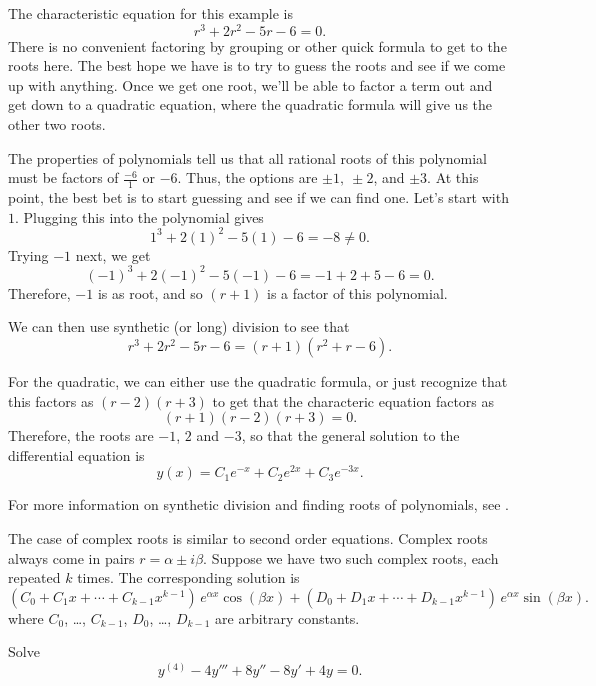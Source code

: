 \documentclass{ximera}
\begin{document}
\begin{exampleSol}
    The characteristic equation for this example is
    \[ 
        r^3 + 2r^2 - 5r - 6 = 0.
    \]
    There is no convenient factoring by grouping or other quick formula to get to the roots here. The best hope we have is to try to guess the roots and see if we come up with anything. Once we get one root, we'll be able to factor a term out and get down to a quadratic equation, where the quadratic formula will give us the other two roots. 
    
    The properties of polynomials tell us that all rational roots of this polynomial must be factors of $\frac{-6}{1}$ or $-6$. Thus, the options are $\pm 1,\ \pm 2$, and $\pm 3$. At this point, the best bet is to start guessing and see if we can find one. Let's start with $1$. Plugging this into the polynomial gives
    \[ 
        1^3 + 2(1)^2 - 5(1) - 6 = -8 \neq 0. 
    \] 
    Trying $-1$ next, we get
    \[ 
        (-1)^3 + 2(-1)^2 - 5(-1) - 6 = -1+2+5-6 = 0. 
    \] 
    Therefore, $-1$ is as root, and so $(r+1)$ is a factor of this polynomial. 
    
    We can then use synthetic (or long) division to see that
    \[ 
        r^3 + 2r^2 - 5r - 6 = (r+1)(r^2 + r - 6).
    \]
    
    For the quadratic, we can either use the quadratic formula, or just recognize that this factors as $(r-2)(r+3)$ to get that the characteric equation factors as 
    \[ 
        (r+1)(r-2)(r+3) = 0.
    \] 
    Therefore, the roots are $-1$, $2$ and $-3$, so that the general solution to the differential equation is
    \[ 
        y(x) = C_1 e^{-x} + C_2 e^{2x}+ C_3e^{-3x}. 
    \]
\end{exampleSol}

For more information on synthetic division and finding roots of polynomials, see . 

The case of complex roots is similar to second order equations. Complex roots always come in pairs $r = \alpha \pm i \beta$.  Suppose we have two such complex roots, each repeated $k$ times. The corresponding solution is
\begin{equation*}
    ( C_0 + C_1 x + \cdots + C_{k-1} x^{k-1} ) \, e^{\alpha x} \cos (\beta x) + ( D_0 + D_1 x + \cdots + D_{k-1} x^{k-1} ) \, e^{\alpha x} \sin (\beta x) .
\end{equation*}
where $C_0$, \ldots, $C_{k-1}$, $D_0$, \ldots, $D_{k-1}$ are arbitrary constants.

\begin{example}
    Solve
    \begin{equation*}
        y^{(4)} - 4 y''' + 8 y'' - 8 y' + 4y = 0 .
    \end{equation*}
\end{example}
\end{document}
